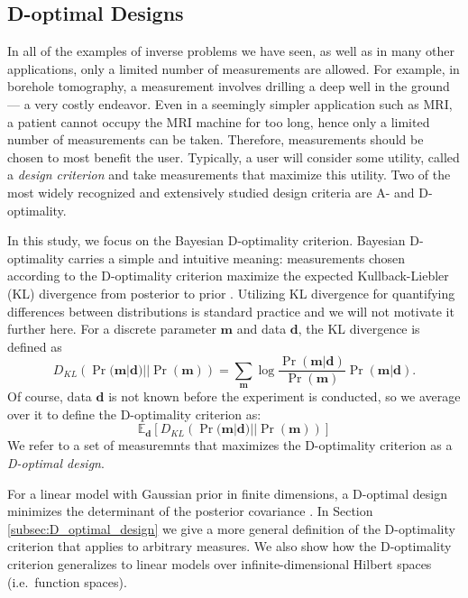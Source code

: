 \documentclass[ba]{imsart}
\newcommand{\data}{\mathbf{d}}
\newcommand{\param}{\mathbf{m}}
\theoremstyle{plain}
\theoremstyle{definition}
\theoremstyle{remark}
\begin{document}
\subsection{D-optimal Designs}\label{subsec:D}
In all of the examples of inverse problems we have seen, as well as in
many other applications, only a limited number of measurements are
allowed. For example, in borehole tomography, a measurement involves
drilling a deep well in the ground --- a very costly endeavor. Even in
a seemingly simpler application such as MRI, a patient cannot occupy
the MRI machine for too long, hence only a limited number of
measurements can be taken. Therefore, measurements should be chosen to
most benefit the user. Typically, a user will consider some utility,
called a \emph{design criterion} and take measurements that maximize
this utility. Two of the most widely recognized and extensively
studied design criteria are A- and D-optimality.

In this study, we focus on the Bayesian D-optimality
criterion. Bayesian D-optimality carries a simple and intuitive
meaning: measurements chosen according to the D-optimality criterion
maximize the expected Kullback-Liebler (KL) divergence from posterior
to prior \cite{chaloner1995, AlexanderianGloorGhattas14,
  CoverThomas91}. Utilizing KL divergence for quantifying differences
between distributions is standard practice and we will not motivate it
further here. For a discrete parameter $\param$ and data $\data$, the
KL divergence is defined as
\begin{equation}\label{eq:basic_KL}
  D_{KL}\left (\Pr(\param|\data)||\Pr(\param)\right ) =  \sum_{\param} \log
  \frac{\Pr(\param|\data)}{\Pr(\param)} \Pr(\param|\data). 
\end{equation}
Of course, data $\data$ is not known before the experiment is
conducted, so we average over it to define the D-optimality criterion
as:
\begin{equation*}
  \mathbb{E}_{\data}\left [ D_{KL}\left (\Pr(\param|\data)||\Pr(\param)\right ) \right ]
\end{equation*}
We refer to a set of measuremnts that maximizes the D-optimality
criterion as a \emph{D-optimal design}.

For a linear model with Gaussian prior in finite dimensions, a
D-optimal design minimizes the determinant of the posterior covariance
\cite{chaloner1995}. In Section \ref{subsec:D_optimal_design} we give
a more general definition of the D-optimality criterion that applies
to arbitrary measures. We also show how the D-optimality criterion
generalizes to linear models over infinite-dimensional Hilbert spaces
(i.e.~function spaces).
\end{document}
